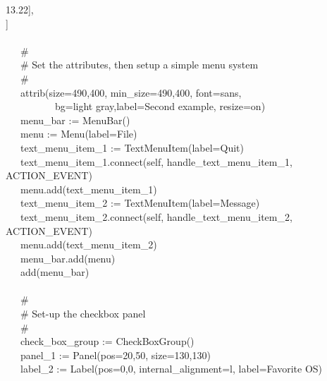 {{\textquotedbl}13.22{\textquotedbl}], \\
\>\>] \\
\ \\
\>   \ \ \ \# \\
\>   \ \ \ \# Set the attributes, then setup a simple menu system \\
\>   \ \ \ \# \\
\>   \ \ \ attrib({\textquotedbl}size=490,400{\textquotedbl},
{\textquotedbl}min\_size=490,400{\textquotedbl},
{\textquotedbl}font=sans{\textquotedbl}, \\
\>   \ \ \ \ \ \ \ \ \ \ {\textquotedbl}bg=light
gray{\textquotedbl},{\textquotedbl}label=Second example{\textquotedbl},
{\textquotedbl}resize=on{\textquotedbl}) \\
\>   \ \ \ menu\_bar := MenuBar() \\
\>   \ \ \ menu := Menu({\textquotedbl}label=File{\textquotedbl}) \\
\>   \ \ \ text\_menu\_item\_1 :=
TextMenuItem({\textquotedbl}label=Quit{\textquotedbl}) \\
\>   \ \ \ text\_menu\_item\_1.connect(self,
{\textquotedbl}handle\_text\_menu\_item\_1{\textquotedbl},
ACTION\_EVENT) \\
\>   \ \ \ menu.add(text\_menu\_item\_1) \\
\>   \ \ \ text\_menu\_item\_2 :=
TextMenuItem({\textquotedbl}label=Message{\textquotedbl}) \\
\>   \ \ \ text\_menu\_item\_2.connect(self,
{\textquotedbl}handle\_text\_menu\_item\_2{\textquotedbl},
ACTION\_EVENT) \\
\>   \ \ \ menu.add(text\_menu\_item\_2) \\
\>   \ \ \ menu\_bar.add(menu) \\
\>   \ \ \ add(menu\_bar) \\
\ \\
\>   \ \ \ \# \\
\>   \ \ \ \# Set-up the checkbox panel \\
\>   \ \ \ \# \\
\>   \ \ \ check\_box\_group := CheckBoxGroup() \\
\>   \ \ \ panel\_1 := Panel({\textquotedbl}pos=20,50{\textquotedbl},
{\textquotedbl}size=130,130{\textquotedbl}) \\
\>   \ \ \ label\_2 := Label({\textquotedbl}pos=0,0{\textquotedbl},
{\textquotedbl}internal\_alignment=l{\textquotedbl},
{\textquotedbl}label=Favorite OS{\textquotedbl}) \\
}
